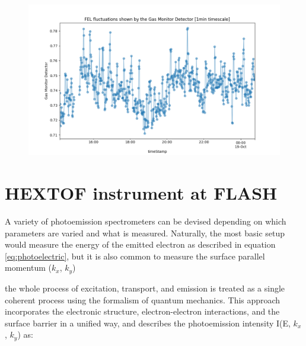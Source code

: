 \begin{figure}
    \includegraphics[width=1\linewidth]{images/2024-08-16-13-56-32.png}
\end{figure}



\section{HEXTOF instrument at FLASH}
A variety of photoemission spectrometers can be devised depending on which parameters are varied and what is measured. Naturally, the most basic setup would measure the energy of the emitted electron as described in equation \ref{eq:photoelectric}, but it is also common to measure the surface parallel momentum ($k_x$, $k_y$)

the whole process of excitation, transport, and emission is treated as a single coherent process using the formalism of quantum mechanics. This approach incorporates the electronic structure, electron-electron interactions, and the surface barrier in a unified way, and describes the photoemission intensity  I(E, $k_x$, $k_y$)  as:





